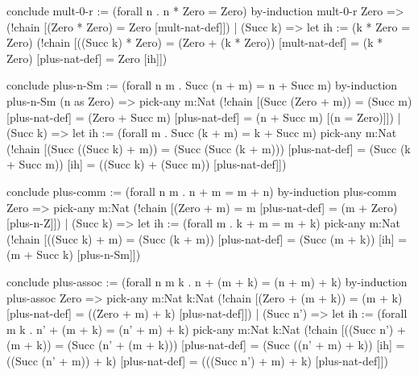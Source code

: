 %
%
\begin{tcAthena}
conclude mult-0-r := (forall n . n * Zero = Zero)
  by-induction mult-0-r {
    Zero     => (!chain [(Zero * Zero) = Zero  [mult-nat-def]])
  | (Succ k) => let {ih := (k * Zero = Zero)}
                  (!chain [((Succ k) * Zero)
                         = (Zero + (k * Zero)) [mult-nat-def]
                         = (k * Zero)          [plus-nat-def]
                         = Zero                [ih]])
  }

conclude plus-n-Sm := (forall n m . Succ (n + m) = n + Succ m)
  by-induction plus-n-Sm {
    (n as Zero) => pick-any m:Nat
                     (!chain [(Succ (Zero + m))
                            = (Succ m)         [plus-nat-def]
                            = (Zero + Succ m)  [plus-nat-def]
                            = (n + Succ m)     [(n = Zero)]])
  | (Succ k) =>
      let {ih := (forall m . Succ (k + m) = k + Succ m)}
        pick-any m:Nat
          (!chain [(Succ ((Succ k) + m))
                 = (Succ (Succ (k + m)))       [plus-nat-def]
                 = (Succ (k + Succ m))         [ih]
                 = ((Succ k) + (Succ m))       [plus-nat-def]])
  }

conclude plus-comm := (forall n m . n + m = m + n)
  by-induction plus-comm {
    Zero => pick-any m:Nat
              (!chain [(Zero + m)
                     = m                       [plus-nat-def]
                     = (m + Zero)              [plus-n-Z]])
  | (Succ k) => let {ih := (forall m . k + m = m + k)}
                  pick-any m:Nat
                    (!chain [((Succ k) + m)
                           = (Succ (k + m))    [plus-nat-def]
                           = (Succ (m + k))    [ih]
                           = (m + Succ k)      [plus-n-Sm]])
  }


conclude plus-assoc := (forall n m k . n + (m + k) = (n + m) + k)
  by-induction plus-assoc {
    Zero => pick-any m:Nat k:Nat
             (!chain [(Zero + (m + k))
                    = (m + k)                  [plus-nat-def]
                    = ((Zero + m) + k)         [plus-nat-def]])
  | (Succ n') =>
      let {ih := (forall m k . n' + (m + k) = (n' + m) + k)}
        pick-any m:Nat k:Nat
          (!chain [((Succ n') + (m + k))
                  = (Succ (n' + (m + k)))      [plus-nat-def]
                  = (Succ ((n' + m) + k))      [ih]
                  = ((Succ (n' + m)) + k)      [plus-nat-def]
                  = (((Succ n') + m) + k)      [plus-nat-def]])
  }
\end{tcAthena}
